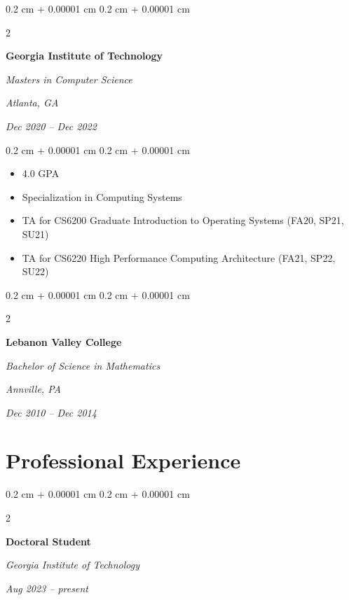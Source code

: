 \documentclass[10pt, letterpaper]{article}
\newenvironment{highlights}{
    \begin{itemize}[
        topsep=0.10 cm,
        parsep=0.10 cm,
        partopsep=0pt,
        itemsep=0pt,
        leftmargin=0.4 cm + 10pt
    ]
}{
    \end{itemize}
} %
\newenvironment{onecolentry}{
    \begin{adjustwidth}{
        0.2 cm + 0.00001 cm
    }{
        0.2 cm + 0.00001 cm
    }
}{
    \end{adjustwidth}
} %
\newenvironment{twocolentry}[2][]{
    \onecolentry
    \def\secondColumn{#2}
    \setcolumnwidth{\fill, 4.5 cm}
    \begin{paracol}{2}
}{
    \switchcolumn \raggedleft \secondColumn
    \end{paracol}
    \endonecolentry
} %
\begin{document}
        \vspace{0.2 cm}

        \begin{twocolentry}{
        \textit{Atlanta, GA}    
            
        \textit{Dec 2020 – Dec 2022}}
            \textbf{Georgia Institute of Technology}

            \textit{Masters in Computer Science}
        \end{twocolentry}

        \vspace{0.10 cm}
        \begin{onecolentry}
            \begin{highlights}
                \item 4.0 GPA
                \item Specialization in Computing Systems
                \item TA for CS6200 Graduate Introduction to Operating Systems (FA20, SP21, SU21)
                \item TA for CS6220 High Performance Computing Architecture (FA21, SP22, SU22)
            \end{highlights}
        \end{onecolentry}


        \vspace{0.2 cm}

        \begin{twocolentry}{
        \textit{Annville, PA}    
            
        \textit{Dec 2010 – Dec 2014}}
            \textbf{Lebanon Valley College}

            \textit{Bachelor of Science in Mathematics}
        \end{twocolentry}




    
    \section{Professional Experience}



        
        \begin{twocolentry}{
            
            
        \textit{Aug 2023 – present}}
            \textbf{Doctoral Student}
            
            \textit{Georgia Institute of Technology}
        \end{twocolentry}
\end{document}
